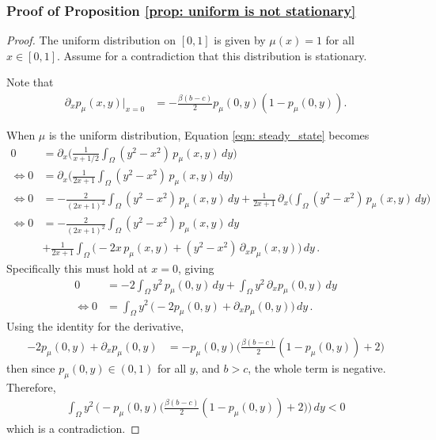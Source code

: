 \documentclass[10pt]{article}
\begin{document}
\subsubsection*{Proof of Proposition \ref{prop: uniform is not stationary}}
\begin{proof}
    The uniform distribution on $[0,1]$ is given by $\mu(x)=1$ for all $x\in[0,1]$. Assume for a contradiction that this distribution is stationary.
    
    Note that
    \begin{align*}
        \partial_x p_\mu(x,y)\big|_{x=0} &= -\frac{\beta(b-c)}{2} p_\mu(0,y) (1- p_\mu(0,y)).
    \end{align*}
    
    When $\mu$ is the uniform distribution, Equation \eqref{eqn: steady_state} becomes
    \begin{align*}
        0 &= \partial_x \Bigg( \frac{1}{x+1/2} \int_{\Omega} (y^2-x^2)\,p_\mu(x,y)\,dy\Bigg) \\
        \iff 0 &= \partial_x\Bigg( \frac{1}{2x+1} \int_{\Omega} (y^2-x^2)\,p_\mu(x,y)\,dy\Bigg) \\
        \iff 0 &= -\frac{2}{(2x+1)^2} \int_{\Omega} (y^2-x^2)\,p_\mu(x,y)\,dy + \frac{1}{2x+1} \,\partial_x \bigg( \int_{\Omega} (y^2-x^2)\,p_\mu(x,y)\,dy \bigg)\\
        \iff 0 &= -\frac{2}{(2x+1)^2} \int_{\Omega} (y^2-x^2)\,p_\mu(x,y)\,dy 
        \\&+ \frac{1}{2x+1} \int_{\Omega} \Big( -2x \,p_\mu(x,y) + (y^2-x^2)\,\partial_xp_\mu(x,y) \Big)\,dy \,.
    \end{align*}
    Specifically this must hold at $x=0$, giving
    \begin{align*} 
        0 &= -2 \int_{\Omega} y^2\,p_\mu(0,y)\,dy 
        + \int_{\Omega} y^2\,\partial_xp_\mu(0,y) \,dy \\
        \iff 0 &= \int_{\Omega} y^2\,\Big(-2p_\mu(0,y) + \partial_xp_\mu(0,y) \Big) \,dy \,.
    \end{align*}
    Using the identity for the derivative,
    \begin{align*}
        -2p_\mu(0,y) + \partial_xp_\mu(0,y) &= -p_\mu(0,y)\bigg(\frac{\beta(b-c)}{2} (1- p_\mu(0,y)) + 2\bigg)
    \end{align*}
    then since $p_\mu(0,y) \in (0,1)$ for all $y$, and $b > c$, the whole term is negative. Therefore,
    \begin{align*}
        \int_{\Omega} y^2\,\Big(-p_\mu(0,y)\big(\frac{\beta(b-c)}{2} (1- p_\mu(0,y)) + 2\big) \Big) \,dy <0
    \end{align*}
    which is a contradiction.
\end{proof}
\end{document}

